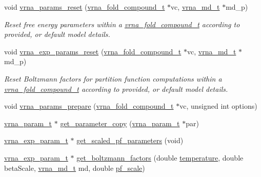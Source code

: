 \begin{DoxyCompactItemize}
void \mbox{\hyperlink{group__energy__parameters_gac40dc82e48a72a97cfc58b9da08a7792}{vrna\+\_\+params\+\_\+reset}} (\mbox{\hyperlink{group__fold__compound_ga1b0cef17fd40466cef5968eaeeff6166}{vrna\+\_\+fold\+\_\+compound\+\_\+t}} $\ast$vc, \mbox{\hyperlink{group__model__details_ga1f8a10e12a0a1915f2a4eff0b28ea17c}{vrna\+\_\+md\+\_\+t}} $\ast$md\+\_\+p)
\begin{DoxyCompactList}\small\item\em Reset free energy parameters within a \mbox{\hyperlink{group__fold__compound_ga1b0cef17fd40466cef5968eaeeff6166}{vrna\+\_\+fold\+\_\+compound\+\_\+t}} according to provided, or default model details. \end{DoxyCompactList}\item 
void \mbox{\hyperlink{group__energy__parameters_gaa5409218068be84d7b50c78fbdaa85a9}{vrna\+\_\+exp\+\_\+params\+\_\+reset}} (\mbox{\hyperlink{group__fold__compound_ga1b0cef17fd40466cef5968eaeeff6166}{vrna\+\_\+fold\+\_\+compound\+\_\+t}} $\ast$vc, \mbox{\hyperlink{group__model__details_ga1f8a10e12a0a1915f2a4eff0b28ea17c}{vrna\+\_\+md\+\_\+t}} $\ast$md\+\_\+p)
\begin{DoxyCompactList}\small\item\em Reset Boltzmann factors for partition function computations within a \mbox{\hyperlink{group__fold__compound_ga1b0cef17fd40466cef5968eaeeff6166}{vrna\+\_\+fold\+\_\+compound\+\_\+t}} according to provided, or default model details. \end{DoxyCompactList}\item 
void \mbox{\hyperlink{group__energy__parameters_ga881878603a5668e49316d0cd1a10580a}{vrna\+\_\+params\+\_\+prepare}} (\mbox{\hyperlink{group__fold__compound_ga1b0cef17fd40466cef5968eaeeff6166}{vrna\+\_\+fold\+\_\+compound\+\_\+t}} $\ast$vc, unsigned int options)
\item 
\mbox{\hyperlink{group__energy__parameters_ga8a69ca7d787e4fd6079914f5343a1f35}{vrna\+\_\+param\+\_\+t}} $\ast$ \mbox{\hyperlink{group__energy__parameters_ga1c252a1ef78410efcdcc1998f3c415cb}{get\+\_\+parameter\+\_\+copy}} (\mbox{\hyperlink{group__energy__parameters_ga8a69ca7d787e4fd6079914f5343a1f35}{vrna\+\_\+param\+\_\+t}} $\ast$par)
\item 
\mbox{\hyperlink{group__energy__parameters_ga01d8b92fe734df8d79a6169482c7d8d8}{vrna\+\_\+exp\+\_\+param\+\_\+t}} $\ast$ \mbox{\hyperlink{group__energy__parameters_gabf3b9271c41dd3fac02d56e0b02b3344}{get\+\_\+scaled\+\_\+pf\+\_\+parameters}} (void)
\item 
\mbox{\hyperlink{group__energy__parameters_ga01d8b92fe734df8d79a6169482c7d8d8}{vrna\+\_\+exp\+\_\+param\+\_\+t}} $\ast$ \mbox{\hyperlink{group__energy__parameters_gaef2b931c7e9d4ffb0a5c33df50ec2068}{get\+\_\+boltzmann\+\_\+factors}} (double \mbox{\hyperlink{group__model__details_gab4b11c8d9c758430960896bc3fe82ead}{temperature}}, double beta\+Scale, \mbox{\hyperlink{group__model__details_ga1f8a10e12a0a1915f2a4eff0b28ea17c}{vrna\+\_\+md\+\_\+t}} md, double \mbox{\hyperlink{group__model__details_gad3b22044065acc6dee0af68931b52cfd}{pf\+\_\+scale}})

\end{DoxyCompactItemize}
